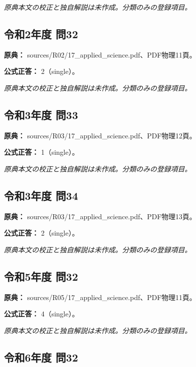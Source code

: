 \par\textit{原典本文の校正と独自解説は未作成。分類のみの登録項目。}

\subsection{令和2年度 問32}
\label{q:r02-reg-applied-32}

\noindent\textbf{原典：} sources/R02/17\_applied\_science.pdf、PDF物理11頁。

\textbf{公式正答：} 2（single）。

\par\textit{原典本文の校正と独自解説は未作成。分類のみの登録項目。}

\subsection{令和3年度 問33}
\label{q:r03-reg-applied-33}

\noindent\textbf{原典：} sources/R03/17\_applied\_science.pdf、PDF物理12頁。

\textbf{公式正答：} 1（single）。

\par\textit{原典本文の校正と独自解説は未作成。分類のみの登録項目。}

\subsection{令和3年度 問34}
\label{q:r03-reg-applied-34}

\noindent\textbf{原典：} sources/R03/17\_applied\_science.pdf、PDF物理13頁。

\textbf{公式正答：} 2（single）。

\par\textit{原典本文の校正と独自解説は未作成。分類のみの登録項目。}

\subsection{令和5年度 問32}
\label{q:r05-reg-applied-32}

\noindent\textbf{原典：} sources/R05/17\_applied\_science.pdf、PDF物理11頁。

\textbf{公式正答：} 4（single）。

\par\textit{原典本文の校正と独自解説は未作成。分類のみの登録項目。}

\subsection{令和6年度 問32}
\label{q:r06-reg-applied-32}

